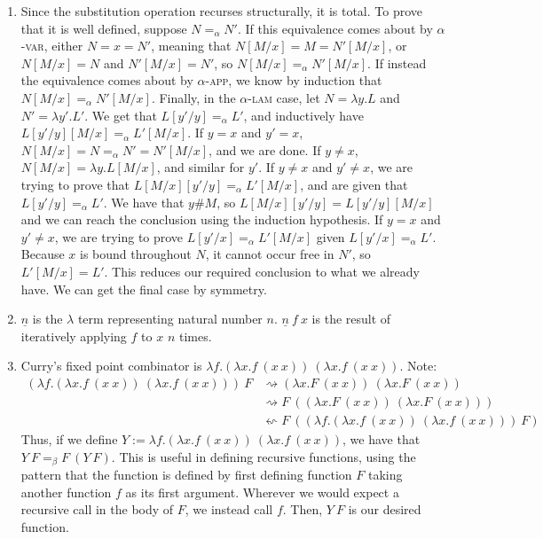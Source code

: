 \documentclass{article}
\begin{document}
\begin{enumerate}
  \item Since the substitution operation recurses structurally, it is total. To prove that it is well defined, suppose $N =_\alpha N'$. If this equivalence comes about by $\alpha$-\textsc{var}, either $N = x = N'$, meaning that $N[M/x] = M = N'[M/x]$, or $N[M/x] = N$ and $N'[M/x] = N'$, so $N[M/x] =_\alpha N'[M/x]$. If instead the equivalence comes about by $\alpha$-\textsc{app}, we know by induction that $N[M/x] =_\alpha N'[M/x]$. Finally, in the $\alpha$-\textsc{lam} case, let $N = \lambda y.L$ and $N' = \lambda y'.L'$. We get that $L[y'/y] =_\alpha L'$, and inductively have $L[y'/y][M/x] =_\alpha L'[M/x]$. If $y = x$ and $y' = x$, $N[M/x] = N =_\alpha N' = N'[M/x]$, and we are done. If $y \neq x$, $N[M/x] = \lambda y.L[M/x]$, and similar for $y'$. If $y \neq x$ and $y' \neq x$, we are trying to prove that $L[M/x][y'/y] =_\alpha L'[M/x]$, and are given that $L[y'/y] =_\alpha L'$. We have that $y \# M$, so $L[M/x][y'/y] = L[y'/y][M/x]$ and we can reach the conclusion using the induction hypothesis. If $y = x$ and $y' \neq x$, we are trying to prove $L[y'/x] =_\alpha L'[M/x]$ given $L[y'/x] =_\alpha L'$. Because $x$ is bound throughout $N$, it cannot occur free in $N'$, so $L'[M/x] = L'$. This reduces our required conclusion to what we already have. We can get the final case by symmetry.
  \item $\underline n$ is the $\lambda$ term representing natural number $n$. $\underline n~f~x$ is the result of iteratively applying $f$ to $x$ $n$ times.
  \item Curry's fixed point combinator is $\lambda f.(\lambda x.f~(x~x))~(\lambda x.f~(x~x))$. Note:
    \begin{align*}
      (\lambda f.(\lambda x.f~(x~x))~(\lambda x.f~(x~x)))~F
      & \rightsquigarrow (\lambda x.F~(x~x))~(\lambda x.F~(x~x))
      \\
      & \rightsquigarrow F~((\lambda x.F~(x~x))~(\lambda x.F~(x~x)))
      \\
      & \leftsquigarrow F~((\lambda f.(\lambda x.f~(x~x))~(\lambda x.f~(x~x)))~F)
    \end{align*}
    Thus, if we define $Y := \lambda f.(\lambda x.f~(x~x))~(\lambda x.f~(x~x))$, we have that $Y~F =_\beta F~(Y~F)$. This is useful in defining recursive functions, using the pattern that the function is defined by first defining function $F$ taking another function $f$ as its first argument. Wherever we would expect a recursive call in the body of $F$, we instead call $f$. Then, $Y~F$ is our desired function.


\end{enumerate}
\end{document}
